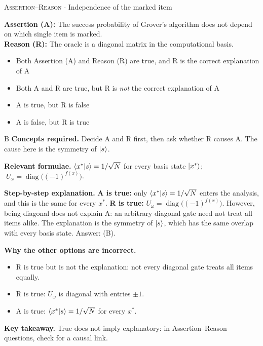 \documentclass[11pt,a4paper]{article}
\newcommand{\optlabel}[1]{\textbf{(#1)}}
\newcommand{\correctlabel}[1]{\textcolor{okgreen}{\textbf{(#1)}\,\ding{51}}}
\newenvironment{qitem}[1]{\begin{list}{}{\setlength{\leftmargin}{3.3em}\setlength{\labelwidth}{3.1em}%
  \setlength{\labelsep}{0.2em}\setlength{\topsep}{3pt}\setlength{\parsep}{3pt}}\item[\textbf{Q.#1}\hfill]}{\end{list}}
\newcommand{\qsep}{\par\vspace{2pt}{\color{black!15}\hrule}\vspace{4pt}}
\newcommand{\qmeta}[2]{{\footnotesize\color{black!60}\textsc{#1} \;$\cdot$\; #2}\par}
\begin{document}
\begin{qitem}{57}
\qmeta{Assertion--Reason}{Independence of the marked item}
\textbf{Assertion (A):} The success probability of Grover's algorithm does not depend on which single item is marked.\\[1mm]
\textbf{Reason (R):} The oracle is a diagonal matrix in the computational basis.
\begin{itemize}[leftmargin=2.6em, labelsep=0.4em, itemsep=2pt, topsep=3pt]
\item[\optlabel{A}] Both Assertion (A) and Reason (R) are true, and R is the correct explanation of A
\item[\correctlabel{B}] Both A and R are true, but R is \emph{not} the correct explanation of A
\item[\optlabel{C}] A is true, but R is false
\item[\optlabel{D}] A is false, but R is true
\end{itemize}
\end{qitem}
\begin{solbox}{B}
\textbf{\color{brand}Concepts required.} Decide A and R first, then ask whether R causes A. The cause here is the symmetry of $\ket{s}$.

\textbf{\color{brand}Relevant formulae.} $\braket{x^\ast|s} = 1/\sqrt N$ for every basis state $\ket{x^\ast}$; $\;U_\omega = \operatorname{diag}\big((-1)^{f(x)}\big)$.

\textbf{\color{brand}Step-by-step explanation.} \textbf{A is true:} only $\braket{x^\ast|s} = 1/\sqrt N$ enters the analysis, and this is the same for every $x^\ast$.
\textbf{R is true:} $U_\omega = \operatorname{diag}\big((-1)^{f(x)}\big)$. However, being diagonal does not explain A: an arbitrary diagonal gate need not treat all items alike. The explanation is the symmetry of $\ket{s}$, which has the same overlap with every basis state. Answer: (B).

\textbf{\color{brand}Why the other options are incorrect.}
\begin{itemize}[leftmargin=2.4em, itemsep=1pt, topsep=2pt]
\item[\textbf{(A)}] R is true but is not the explanation: not every diagonal gate treats all items equally.
\item[\textbf{(C)}] R is true: $U_\omega$ is diagonal with entries $\pm1$.
\item[\textbf{(D)}] A is true: $\braket{x^\ast|s} = 1/\sqrt N$ for every $x^\ast$.
\end{itemize}
\textbf{\color{brand}Key takeaway.} True does not imply explanatory: in Assertion--Reason questions, check for a causal link.
\end{solbox}
\qsep
\end{document}
